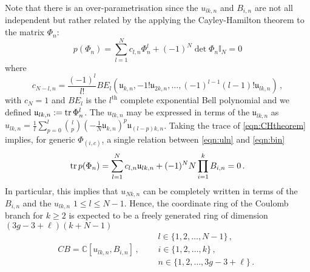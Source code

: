 \documentclass[main.tex]{subfiles}
\begin{document}
Note that there is an over-parametrisation since the $u_{lk,n}$ and $B_{i,n}$ are not all independent but rather related by the applying the Cayley-Hamilton theorem to the matrix $\Phi_n$:
\begin{equation}\label{eqn:CHtheorem}
p(\Phi_n)=\sum_{l=1}^Nc_{l,n}\Phi_n^l+(-1)^N\det\Phi_n\mathbb{I}_{N}=0
\end{equation} 
where 
\begin{equation}
c_{N-l,n}=\frac{(-1)^l}{l!}BE_l\left(\mathfrak{u}_{k,n},-1!\mathfrak{u}_{2k,n},\dots,(-1)^{l-1}(l-1)!\mathfrak{u}_{lk,n}\right)\,,
\end{equation}
with $c_N=1$ and $BE_l$ is the $l^{\text{th}}$ complete exponential Bell polynomial and we defined $\mathfrak{u}_{lk,n}:=\operatorname{tr}\Phi_n^l$. The $u_{lk,n}$ may be expressed in terms of the $\mathfrak{u}_{lk,n}$ as $u_{lk,n}=\frac{1}{l}\sum_{p=0}^l\binom{l}{p}\left(-\frac{1}{N}\mathfrak{u}_{k,n}\right)^p\mathfrak{u}_{(l-p)k,n}$. Taking the trace of \eqref{eqn:CHtheorem} implies, for generic $\Phi_{(i,c)}$, a single relation between \eqref{eqn:uln} and \eqref{eqn:bin}
\begin{equation}
\operatorname{tr} p(\Phi_n)=\sum_{l=1}^Nc_{l,n}\mathfrak{u}_{lk,n}+(-1)^NN\prod_{i=1}^kB_{i,n}=0\,.
\end{equation}
In particular, this implies that $u_{Nk,n}$ can be completely written in terms of the $B_{i,n}$ and the $u_{lk,n}$ $1\leq l\leq N-1$.
Hence, the coordinate ring of the Coulomb branch for $k\geq2$ is expected to be a freely generated ring of dimension $(3g-3+\ell)(k+N-1)$
\begin{equation}
CB=\mathbb{C}[u_{lk,n},B_{i,n}]\,,\quad \begin{aligned}
&l\in\{1,2,\dots,N-1\}\,,\\
&i\in\{1,2,\dots,k\}\,,\\
&n\in\{1,2,\dots,3g-3+\ell\}\,.
\end{aligned}
\end{equation}
\end{document}
